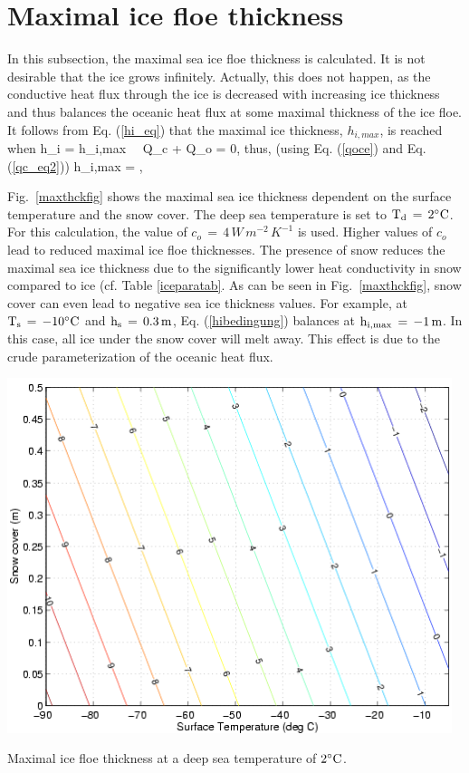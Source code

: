 \section*{Maximal ice floe thickness}
In this subsection, the maximal sea ice floe thickness is calculated. It is 
not desirable
that the ice grows infinitely. Actually, this does not happen, as the 
conductive heat
flux through the ice is decreased with increasing ice thickness and thus 
balances the
oceanic heat flux at some maximal thickness of the ice floe. It follows from
Eq. (\ref{hi_eq}) that the maximal ice thickness, $h_{i,max}$, is reached when
\be
h_i = h_{i,max} \, \iff \, Q_c + Q_o = 0,
\label{hibedingung} \ee
thus, (using Eq. (\ref{qoce}) and Eq. (\ref{qc_eq2}))
\be
h_{i,max} = {\di {},}
\label{himax} \ee

Fig.\ \ref{maxthckfig} shows the maximal sea ice thickness dependent on the
surface temperature and the snow cover. The deep sea temperature is set to
$\rm T_d\,=\,2^\circ C$. For this calculation, the value of $c_o\,=\,4\,W\, 
m^{-2}\, K^{-1}$ is used. 
Higher values of $c_o$ lead to reduced maximal ice floe thicknesses.
The presence of snow reduces the maximal sea ice thickness
due to the significantly lower heat conductivity in snow compared to ice
(cf. Table \ref{iceparatab}. As can be seen in Fig.\ \ref{maxthckfig}, snow cover
can even lead to negative sea ice thickness values. For example,
at $\rm T_s\,=\,-10^\circ C$ and $\rm h_s\,=\,0.3\, m$, Eq. (\ref{hibedingung})
balances at $\rm h_{i,max}\,=\,-1\, m$. In this case, all ice under the snow 
cover will melt
away. This effect is due to the crude parameterization of the oceanic heat 
flux.


\bgfht
\includegraphics[width=13cm]{heiko/modules_icemod_maxthck}
\caption[]{Maximal ice floe thickness at a deep sea temperature of $\rm 
2^\circ C$.}
\label{maxthckfig}
\ef

